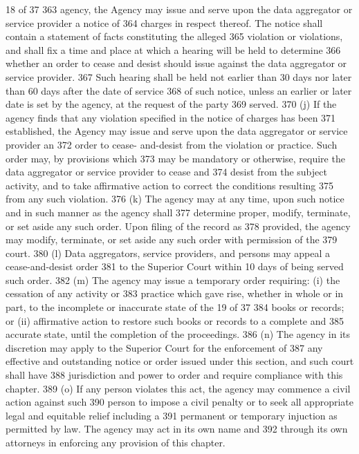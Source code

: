 18 of 37
363 agency, the Agency may issue and serve upon the data aggregator or service provider a notice of
364 charges in respect thereof. The notice shall contain a statement of facts constituting the alleged
365 violation or violations, and shall fix a time and place at which a hearing will be held to determine
366 whether an order to cease and desist should issue against the data aggregator or service provider.
367 Such hearing shall be held not earlier than 30 days nor later than 60 days after the date of service
368 of such notice, unless an earlier or later date is set by the agency, at the request of the party
369 served.
370 (j) If the agency finds that any violation specified in the notice of charges has been
371 established, the Agency may issue and serve upon the data aggregator or service provider an
372 order to cease- and-desist from the violation or practice. Such order may, by provisions which
373 may be mandatory or otherwise, require the data aggregator or service provider to cease and
374 desist from the subject activity, and to take affirmative action to correct the conditions resulting
375 from any such violation.
376 (k) The agency may at any time, upon such notice and in such manner as the agency shall
377 determine proper, modify, terminate, or set aside any such order. Upon filing of the record as
378 provided, the agency may modify, terminate, or set aside any such order with permission of the
379 court.
380 (l) Data aggregators, service providers, and persons may appeal a cease-and-desist order
381 to the Superior Court within 10 days of being served such order.
382 (m) The agency may issue a temporary order requiring: (i) the cessation of any activity or
383 practice which gave rise, whether in whole or in part, to the incomplete or inaccurate state of the
19 of 37
384 books or records; or (ii) affirmative action to restore such books or records to a complete and
385 accurate state, until the completion of the proceedings.
386 (n) The agency in its discretion may apply to the Superior Court for the enforcement of
387 any effective and outstanding notice or order issued under this section, and such court shall have
388 jurisdiction and power to order and require compliance with this chapter.
389 (o) If any person violates this act, the agency may commence a civil action against such
390 person to impose a civil penalty or to seek all appropriate legal and equitable relief including a
391 permanent or temporary injuction as permitted by law. The agency may act in its own name and
392 through its own attorneys in enforcing any provision of this chapter.
